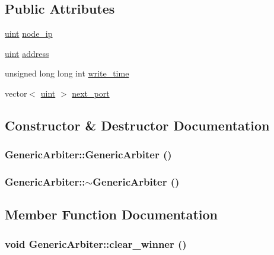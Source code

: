 \subsection*{Public Attributes}
\begin{CompactItemize}
\item 
\hyperlink{outputBuffer_8h_91ad9478d81a7aaf2593e8d9c3d06a14}{uint} \hyperlink{classGenericArbiter_970eebd92edf4b43bd34dbe378aee0b4}{node\_\-ip}
\item 
\hyperlink{outputBuffer_8h_91ad9478d81a7aaf2593e8d9c3d06a14}{uint} \hyperlink{classGenericArbiter_d570be8e0435c540c11f46cd9e68d8fc}{address}
\item 
unsigned long long int \hyperlink{classGenericArbiter_c2b3b3256c40848d1e06cc15e15b7750}{write\_\-time}
\item 
vector$<$ \hyperlink{outputBuffer_8h_91ad9478d81a7aaf2593e8d9c3d06a14}{uint} $>$ \hyperlink{classGenericArbiter_2225ea6ef234e002fb69810552b02262}{next\_\-port}
\end{CompactItemize}


\subsection{Constructor \& Destructor Documentation}
\hypertarget{classGenericArbiter_f268b17257b6084b8faa82e4539580f5}{
\subsubsection[{GenericArbiter}]{\setlength{\rightskip}{0pt plus 5cm}GenericArbiter::GenericArbiter ()}}
\label{classGenericArbiter_f268b17257b6084b8faa82e4539580f5}


\hypertarget{classGenericArbiter_c8e72db9c3fb2c9b406933a104592519}{
\subsubsection[{$\sim$GenericArbiter}]{\setlength{\rightskip}{0pt plus 5cm}GenericArbiter::$\sim$GenericArbiter ()}}
\label{classGenericArbiter_c8e72db9c3fb2c9b406933a104592519}




\subsection{Member Function Documentation}
\hypertarget{classGenericArbiter_137758be6498b8dc717cf4d4c8bc56be}{
\subsubsection[{clear\_\-winner}]{\setlength{\rightskip}{0pt plus 5cm}void GenericArbiter::clear\_\-winner ()}}
\label{classGenericArbiter_137758be6498b8dc717cf4d4c8bc56be}


